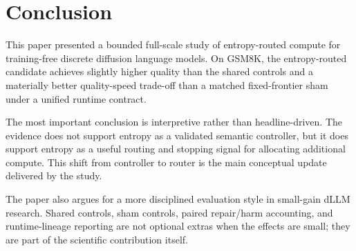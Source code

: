 \documentclass{article}
\begin{document}
\section{Conclusion}

This paper presented a bounded full-scale study of entropy-routed compute for training-free discrete diffusion language models. On GSM8K, the entropy-routed candidate achieves slightly higher quality than the shared controls and a materially better quality-speed trade-off than a matched fixed-frontier sham under a unified runtime contract.

The most important conclusion is interpretive rather than headline-driven. The evidence does not support entropy as a validated semantic controller, but it does support entropy as a useful routing and stopping signal for allocating additional compute. This shift from controller to router is the main conceptual update delivered by the study.

The paper also argues for a more disciplined evaluation style in small-gain dLLM research. Shared controls, sham controls, paired repair/harm accounting, and runtime-lineage reporting are not optional extras when the effects are small; they are part of the scientific contribution itself.



\end{document}
